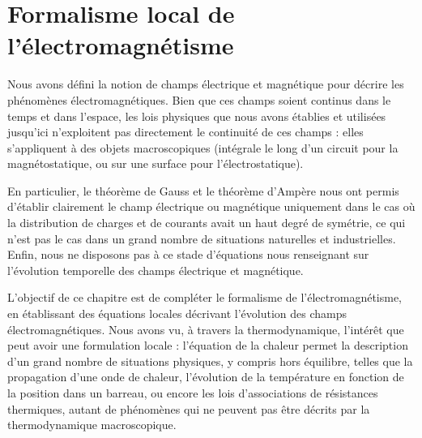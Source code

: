 \documentclass[11pt,fleqn]{book} %
\begin{document}










\setcounter{chapter}{15}

\chapter{Formalisme local de l'électromagnétisme}

Nous avons défini la notion de champs électrique et magnétique pour décrire les phénomènes électromagnétiques. Bien que ces champs soient continus dans le temps et dans l'espace, les lois physiques que nous avons établies et utilisées jusqu'ici n'exploitent pas directement le continuité de ces champs : elles s'appliquent à des objets macroscopiques (intégrale le long d'un circuit pour la magnétostatique, ou sur une surface pour l'électrostatique).

En particulier, le théorème de Gauss et le théorème d'Ampère nous ont permis d'établir clairement le champ électrique ou magnétique uniquement dans le cas où la distribution de charges et de courants avait un haut degré de symétrie, ce qui n'est pas le cas dans un grand nombre de situations naturelles et industrielles. Enfin, nous ne disposons pas à ce stade d'équations nous renseignant sur l'évolution temporelle des champs électrique et magnétique.

L'objectif de ce chapitre est de compléter le formalisme de l'électromagnétisme, en établissant des équations locales décrivant l'évolution des champs électromagnétiques. Nous avons vu, à travers la thermodynamique, l'intérêt que peut avoir une formulation locale : l'équation de la chaleur permet la description d'un grand nombre de situations physiques, y compris hors équilibre, telles que la propagation d'une onde de chaleur, l'évolution de la température en fonction de la position dans un barreau, ou encore les lois d'associations de résistances thermiques, autant de phénomènes qui ne peuvent pas être décrits par la thermodynamique macroscopique.
\end{document}
